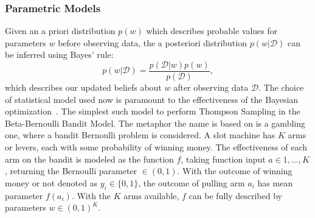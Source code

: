 \subsubsection{Parametric Models}
Given an a priori distribution $p(w)$ which describes probable values for parameters $w$ before observing data, the a posteriori distribution $p(w | \mathcal{D})$ can be inferred using Bayes' rule:
\begin{equation}
\label{eq:bayesrule}
p(w | \mathcal{D}) = \frac{p(\mathcal{D} | w) p(w)}{p(\mathcal{D})},
\end{equation}
which describes our updated beliefs about $w$ after observing data $\mathcal{D}$. The choice of statistical model used now is paramount to the effectiveness of the Bayesian optimization~\cite{bayesian}. The simplest such model to perform Thompson Sampling in the Beta-Bernoulli Bandit Model. The metaphor the name is based on is a gambling one, where a bandit Bernoulli problem is considered. A slot machine has $K$ arms or levers, each with some probability of winning money. The effectiveness of each arm on the bandit is modeled as the function $f$, taking function input $a \in 1,...,K$, returning the Bernoulli parameter $\in (0,1)$. With the outcome of winning money or not denoted as $y_i \in \{0,1\}$, the outcome of pulling arm $a_i$ has mean parameter $f(a_i)$. With the $K$ arms available, $f$ can be fully described by parameters $w\in (0,1)^K$.

